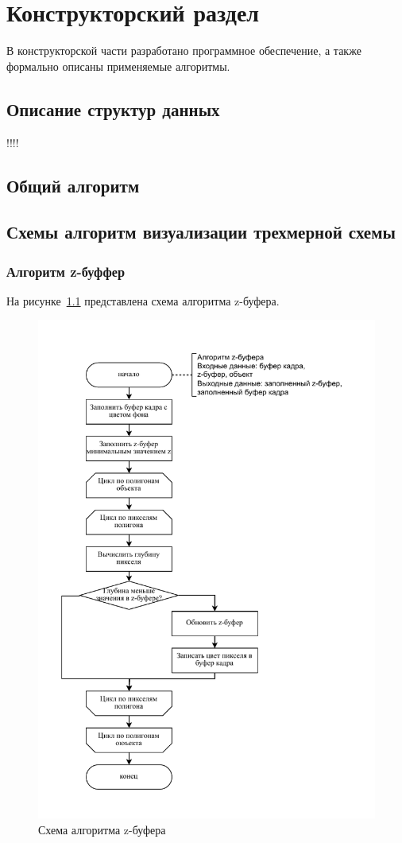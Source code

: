 \chapter{Конструкторский раздел}
В конструкторской части разработано программное обеспечение, а также формально описаны применяемые алгоритмы.

\section{Описание структур данных}
!!!!
\section{Общий алгоритм }
\section{Схемы алгоритм визуализации трехмерной схемы}
\subsection{Алгоритм z-буффер}
На рисунке~\ref{fig:cloud_fcc} представлена схема алгоритма z-буфера.
\begin{figure}[H]
	\centering
	\includegraphics[width=1.0\textwidth, page=1]{assets/img/z_buf_alg.pdf}   
	\caption{Схема алгоритма z-буфера}
	\label{fig:cloud_fcc}
\end{figure}


